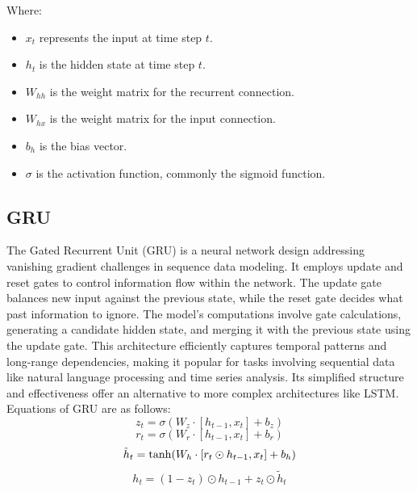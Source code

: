 \documentclass[sn-mathphys,Numbered]{sn-jnl}
\theoremstyle{thmstyleone}
\theoremstyle{thmstyletwo}
\theoremstyle{thmstylethree}
\begin{document}
Where:
\begin{itemize}
\item \(x_t\) represents the input at time step \(t\).
\item \(h_t\) is the hidden state at time step \(t\).
\item \(W_{hh}\) is the weight matrix for the recurrent connection.
\item \(W_{hx}\) is the weight matrix for the input connection.
\item \(b_h\) is the bias vector.
\item \(\sigma\) is the activation function, commonly the sigmoid function.
\end{itemize}
\subsection{GRU}

The Gated Recurrent Unit (GRU) is a neural network design addressing vanishing gradient challenges in sequence data modeling. It employs update and reset gates to control information flow within the network. The update gate balances new input against the previous state, while the reset gate decides what past information to ignore. The model's computations involve gate calculations, generating a candidate hidden state, and merging it with the previous state using the update gate. This architecture efficiently captures temporal patterns and long-range dependencies, making it popular for tasks involving sequential data like natural language processing and time series analysis. Its simplified structure and effectiveness offer an alternative to more complex architectures like LSTM. Equations of GRU are as follows:
\begin{equation}
z_t = \sigma(W_z \cdot [h_{t-1}, x_t] + b_z) 
\end{equation}
\begin{equation}
r_t = \sigma(W_r \cdot [h_{t-1}, x_t] + b_r) 
\end{equation}
\begin{equation}
\tilde{h}_t = \tanh(W_h \cdot [r_t \odot h_{t-1}, x_t] + b_h) \\
\end{equation}
\begin{equation}
h_t = (1 - z_t) \odot h_{t-1} + z_t \odot \tilde{h}_t
\end{equation}
\end{document}
